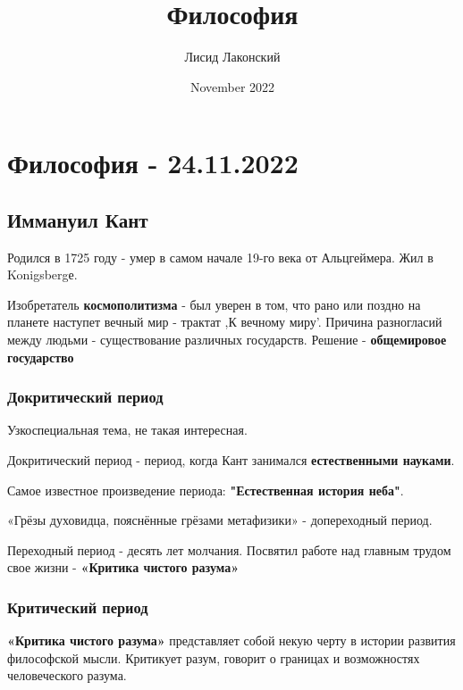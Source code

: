 \documentclass{article}
\title{Философия}
\author{Лисид Лаконский}
\date{November 2022}
\begin{document}
\maketitle
\tableofcontents
\pagebreak

\section{Философия - 24.11.2022}

\subsection{Иммануил Кант}

\begin{flushleft}

Родился в 1725 году - умер в самом начале 19-го века от Альцгеймера. Жил в Konigsbergе.

Изобретатель \textbf{космополитизма} - был уверен в том, что рано или поздно на планете наступет вечный мир - трактат ,К вечному миру'. Причина разногласий между людьми - существование различных государств. Решение - \textbf{общемировое государство} 

\subsubsection{Докритический период}

Узкоспециальная тема, не такая интересная.

Докритический период - период, когда Кант занимался \textbf{естественными науками}.

Самое известное произведение периода: \textbf{"Естественная история неба"}.

\hfill

«Грёзы духовидца, пояснённые грёзами метафизики» - допереходный период.

\hfill

Переходный период - десять лет молчания. Посвятил работе над главным трудом свое жизни - \textbf{«Критика чистого разума»}

\subsubsection{Критический период}

\textbf{«Критика чистого разума»} представляет собой некую черту в истории развития философской мысли. Критикует разум, говорит о границах и возможностях человеческого разума.


\end{flushleft}
\end{document}
